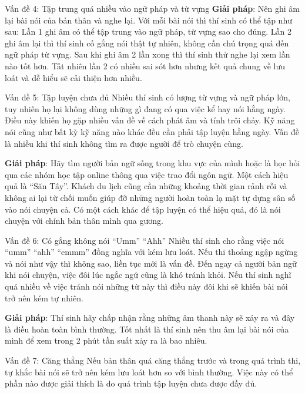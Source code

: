 \begin{multicols}{2}
\begin{qa}{Vấn đề 4: Tập trung quá nhiều vào ngữ pháp và từ vựng}
\vspace{.2cm}
\textbf{Giải pháp}: Nên ghi âm lại bài nói của bản thân và nghe lại. Với mỗi bài nói thì thí sinh có thể tập như sau: Lần 1 ghi âm có thể tập trung vào ngữ pháp, từ vựng sao cho đúng. Lần 2 ghi âm lại thì thí sinh cố gắng nói thật tự nhiên, không cần chú trọng quá đến ngữ pháp từ vựng. Sau khi ghi âm 2 lần xong thì thí sinh thử nghe lại xem lần nào tốt hơn. Tất nhiên lần 2 có nhiều sai sót hơn nhưng kết quả chung về lưu loát và dễ hiểu sẽ cải thiện hơn nhiều.
\end{qa}

\begin{qa}{Vấn đề 5: Tập luyện chưa đủ}
Nhiều thí sinh có lượng từ vựng và ngữ pháp lớn, tuy nhiên họ lại không dùng những gì đang có qua việc kể hay nói hằng ngày. Điều này khiến họ gặp nhiều vấn đề về cách phát âm và tính trôi chảy. Kỹ năng nói cũng như bất kỳ kỹ năng nào khác đều cần phải tập luyện hằng ngày. Vấn đề là nhiều khi thí sinh không tìm ra được người để trò chuyện cùng.

\vspace{.2cm}
\textbf{Giải pháp}: Hãy tìm người bản ngữ sống trong khu vực của mình hoặc là học hỏi qua các nhóm học tập online thông qua việc trao đổi ngôn ngữ. Một cách hiệu quả là “Săn Tây”. Khách du lịch cũng cần những khoảng thời gian rảnh rỗi và không ai lại từ chối muốn giúp đỡ những người hoàn toàn lạ mặt tự dựng sân số vào nói chuyện cả. Có một cách khác để tập luyện có thể hiệu quả, đó là nói chuyện với chính bản thân mình qua gương.
\end{qa}

\begin{qa}{Vấn đề 6: Có gắng không nói “Umm” “Ahh”}
Nhiều thí sinh cho rằng việc nói “umm” “ahh” “emmm” đồng nghĩa với kém lưu loát. Nếu thi thoảng ngập ngừng và nói như vậy thì không sao, liền tục mới là vấn đề. Đến ngay cả người bản ngữ khi nói chuyện, việc đôi lúc ngắc ngứ cũng là khó tránh khỏi. Nếu thí sinh nghĩ quá nhiều về việc tránh nói những từ này thì điều này đôi khi sẽ khiến bài nói trở nên kém tự nhiên.

\vspace{.2cm}
\textbf{Giải pháp}: Thí sinh hãy chấp nhận rằng những âm thanh này sẽ xảy ra và đây là điều hoàn toàn bình thường. Tốt nhất là thí sinh nên thu âm lại bài nói của mình để xem trong 2 phút tần suất xảy ra là bao nhiêu.
\end{qa}

\begin{qa}{Vấn đề 7: Căng thẳng}
Nếu bản thân quá căng thẳng trước và trong quá trình thi, tự khắc bài nói sẽ trở nên kém lưu loát hơn so với bình thường. Việc này có thể phần nào được giải thích là do quá trình tập luyện chưa được đầy đủ.


\end{qa}
\end{multicols}
